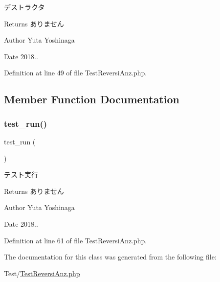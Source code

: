 デストラクタ 

\begin{DoxyReturn}{Returns}
ありません 
\end{DoxyReturn}
\begin{DoxyAuthor}{Author}
Yuta Yoshinaga 
\end{DoxyAuthor}
\begin{DoxyDate}{Date}
2018.. 
\end{DoxyDate}


Definition at line 49 of file Test\+Reversi\+Anz.\+php.



\subsection{Member Function Documentation}
\mbox{\label{class_test_reversi_anz_a9b029832cfdf19c0ef36b1f5ef7b7735}} 
\subsubsection{\texorpdfstring{test\+\_\+run()}{test\_run()}}
{\footnotesize\ttfamily test\+\_\+run (\begin{DoxyParamCaption}{ }\end{DoxyParamCaption})}



テスト実行 

\begin{DoxyReturn}{Returns}
ありません 
\end{DoxyReturn}
\begin{DoxyAuthor}{Author}
Yuta Yoshinaga 
\end{DoxyAuthor}
\begin{DoxyDate}{Date}
2018.. 
\end{DoxyDate}


Definition at line 61 of file Test\+Reversi\+Anz.\+php.



The documentation for this class was generated from the following file\+:\begin{DoxyCompactItemize}
\item 
Test/\hyperlink{_test_reversi_anz_8php}{Test\+Reversi\+Anz.\+php}\end{DoxyCompactItemize}
